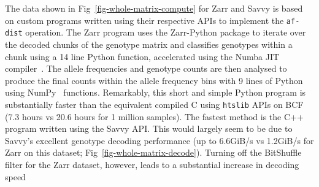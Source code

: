 \documentclass[a4paper,num-refs]{oup-contemporary}
\begin{document}
The data shown in Fig~\ref{fig-whole-matrix-compute} for Zarr and Savvy
is based on custom programs written using their respective APIs
to implement the \texttt{af-dist} operation. The Zarr program uses
the Zarr-Python package to iterate over the decoded chunks of the
genotype matrix and classifies genotypes within a chunk using a 14 line Python
function, accelerated using the Numba JIT compiler~\cite{lam2015numba}.
The allele frequencies and genotype counts are then analysed to produce
the final counts within the allele frequency bins with 9 lines of
Python using NumPy~\cite{harris2020array} functions. Remarkably, this
short and simple Python program is substantially faster than the
equivalent compiled C using \texttt{htslib} APIs on BCF (7.3 hours
vs 20.6 hours for 1 million samples).
The fastest method is the
C++ program written using the Savvy API. This would largely seem
to be due to Savvy's excellent genotype decoding performance
(up to 6.6GiB/s vs 1.2GiB/s for Zarr on this dataset;
Fig~\ref{fig-whole-matrix-decode}).
Turning off the BitShuffle filter for the Zarr dataset,
however, leads to a substantial increase in decoding speed
\end{document}
